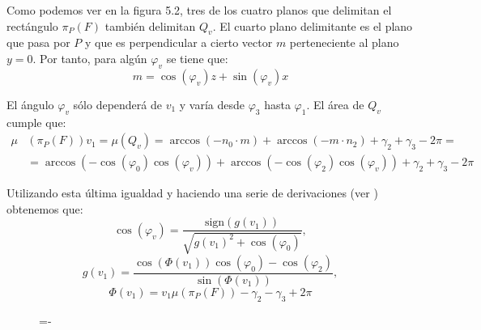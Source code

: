 Como podemos ver en la figura 5.2, tres de los cuatro planos que delimitan el rectángulo $\pi_P(F)$ también delimitan $Q_v$. El cuarto plano delimitante es el plano que pasa por $P$ y que es perpendicular a cierto vector $m$ perteneciente al plano $y=0$. Por tanto, para algún $\varphi_v$ se tiene que:
$$m=\cos(\varphi_v)z+\sin(\varphi_v)x$$

El ángulo $\varphi_v$ sólo dependerá de $v_1$ y varía desde $\varphi_3$ hasta $\varphi_1$. El área de $Q_v$ cumple que:
\begin{align*}
\mu&(\pi_P(F))v_1 = \mu(Q_v) = \arccos(-n_0\cdot m) +\arccos(-m\cdot n_2) + \gamma_2 +\gamma_3 -2\pi =\\
&= \arccos(-\cos(\varphi_0) \cos(\varphi_v)) +\arccos(-\cos(\varphi_2) \cos(\varphi_v)) + \gamma_2 +\gamma_3 -2\pi 
\end{align*}

Utilizando esta última igualdad y haciendo una serie de derivaciones (ver \cite{Urena2013}) obtenemos que:
$$\cos(\varphi_v) = \frac{\text{sign}(g(v_1))}{\sqrt{g(v_1)^2+\cos(\varphi_0)}}, $$
$$g(v_1) = \frac{\cos(\Phi(v_1))\cos(\varphi_0) - \cos(\varphi_2)}{\sin(\Phi(v_1))}, $$
$$\Phi(v_1) = v_1\mu(\pi_P(F))-\gamma_2-\gamma_3+2\pi$$


\begin{figure}[h]
  \lineskip=-\fboxrule
\end{figure}

